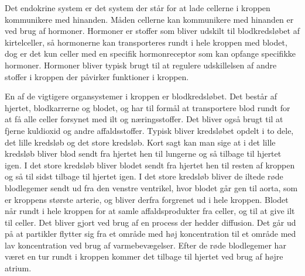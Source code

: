 Det endokrine system er det system der står for at lade cellerne i kroppen kommunikere med hinanden. Måden cellerne kan kommunikere med hinanden er ved brug af hormoner. Hormoner er stoffer som bliver udskilt til blodkredsløbet af kirtelceller, så hormonerne kan transporteres rundt i hele kroppen med blodet, dog er det kun celler med en specifik hormonreceptor som kan opfange specifikke hormoner. Hormoner bliver typisk brugt til at regulere udskillelsen af andre stoffer i kroppen der påvirker funktioner i kroppen. 

En af de vigtigere organsystemer i kroppen er blodkredsløbet. Det består af hjertet, blodkarrerne og blodet, og har til formål at transportere blod rundt for at få alle celler forsynet med ilt og næringsstoffer. Det bliver også brugt til at fjerne kuldioxid og andre affaldsstoffer. Typisk bliver kredsløbet opdelt i to dele, det lille kredsløb og det store kredsløb. Kort sagt kan man sige at i det lille kredsløb bliver blod sendt fra hjertet hen til lungerne og så tilbage til hjertet igen. I det store kredsløb bliver blodet sendt fra hjertet hen til resten af kroppen og så til sidst tilbage til hjertet igen.
I det store kredsløb bliver de iltede røde blodlegemer sendt ud fra den venstre ventrikel, hvor blodet går gen til aorta, som er kroppens største arterie, og bliver derfra forgrenet ud i hele kroppen. Blodet når rundt i hele kroppen for at samle affaldsprodukter fra celler, og til at give ilt til celler. Det bliver gjort ved brug af en process der hedder diffusion. Det går ud på at partikler flytter sig fra et område med høj koncentration til et område med lav koncentration ved brug af varmebevægelser. Efter de røde blodlegemer har været en tur rundt i kroppen kommer det tilbage til hjertet ved brug af højre atrium.

